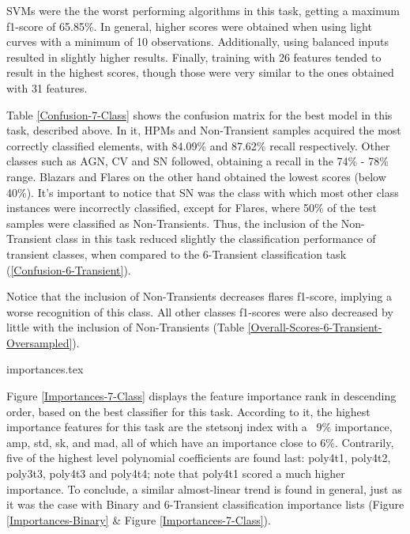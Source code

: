 \documentclass[a4paper,fleqn,usenatbib]{mnras}
\begin{document}
SVMs were the the worst performing algorithms in this task, getting a maximum f1-score of 65.85\%. In general, higher scores were obtained when using light curves with a minimum of 10 observations. Additionally, using balanced inputs resulted in slightly higher results. Finally, training with 26 features tended to result in the highest scores, though those were very similar to the ones obtained with 31 features.

Table \ref{Confusion-7-Class} shows the confusion matrix for the best model in this task, described above. In it, HPMs and Non-Transient samples acquired the most correctly classified elements, with 84.09\% and 87.62\% recall respectively. Other classes such as AGN, CV and SN followed, obtaining a recall in the 74\% - 78\% range. Blazars and Flares on the other hand obtained the lowest scores (below 40\%). It's important to notice that SN was the class with which most other class instances were incorrectly classified, except for Flares, where 50\% of the test samples were classified as Non-Transients. Thus, the inclusion of the Non-Transient class in this task reduced slightly the classification performance of transient classes, when compared to the 6-Transient classification task (\ref{Confusion-6-Transient}).

Notice that the inclusion of Non-Transients decreases flares f1-score, implying a worse recognition of this class. All other classes f1-scores were also decreased by little with the inclusion of Non-Transients (Table \ref{Overall-Scores-6-Transient-Oversampled}).


{importances.tex}

Figure \ref{Importances-7-Class} displays the feature importance rank in descending order, based on the best classifier for this task. 
According to it, the highest importance features for this task are the
stetson\textunderscore j index with a ~9\% importance, amp, std, sk, and mad, all of which have an importance close to 6\%. Contrarily, five of the highest level polynomial coefficients are found last: poly4\textunderscore t1, poly4\textunderscore t2, poly3\textunderscore t3, poly4\textunderscore t3 and poly4\textunderscore t4; note that poly4\textunderscore t1 scored a much higher importance. To conclude, a similar almost-linear trend is found in general, just as it was the case with Binary and 6-Transient classification importance lists (Figure \ref{Importances-Binary} \& Figure \ref{Importances-7-Class}).
\end{document}
